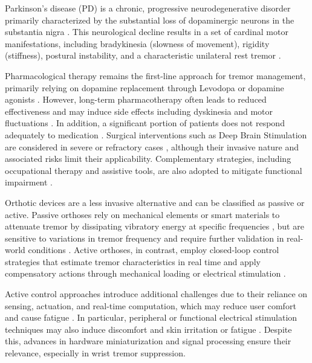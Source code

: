 Parkinson's disease (PD) is a chronic, progressive neurodegenerative disorder primarily characterized by the substantial loss of dopaminergic neurons in the substantia nigra
\citep{Nguyen:2021, Fujikawa:2023, Meng:2022}.
This neurological decline results in a set of cardinal motor manifestations, including bradykinesia (slowness of movement), rigidity (stiffness), postural instability, and a characteristic unilateral rest tremor
\citep{Nguyen:2021, Botzel:2014}. 

Pharmacological therapy remains the first-line approach for tremor management, primarily relying on dopamine replacement through Levodopa or dopamine agonists \citep{Botzel:2014, Lora-Millan:2021}. However, long-term pharmacotherapy often leads to reduced effectiveness and may induce side effects including dyskinesia and motor fluctuations \citep{Lora-Millan:2021, Meng:2022}. In addition, a significant portion of patients does not respond adequately to medication \citep{Fujikawa:2023}. Surgical interventions such as Deep Brain Stimulation are considered in severe or refractory cases \citep{Botzel:2014, Fujikawa:2023}, although their invasive nature and associated risks limit their applicability. Complementary strategies, including occupational therapy and assistive tools, are also adopted to mitigate functional impairment \citep{Mo:2021, Bhidayasiri:2022}.

Orthotic devices are a less invasive alternative and can be classified as passive or active. Passive orthoses rely on mechanical elements or smart materials to attenuate tremor by dissipating vibratory energy at specific frequencies \citep{Gebai:2018, Moura:2025}, but are sensitive to variations in tremor frequency and require further validation in real-world conditions \citep{Heide:2014, Bhidayasiri:2022}. Active orthoses, in contrast, employ closed-loop control strategies that estimate tremor characteristics in real time and apply compensatory actions through mechanical loading or electrical stimulation \citep{Lora-Millan:2021, Meng:2022}.

Active control approaches introduce additional challenges due to their reliance on sensing, actuation, and real-time computation, which may reduce user comfort and cause fatigue \citep{Lora-Millan:2021, Martinez-Nunez:2024}. In particular, peripheral or functional electrical stimulation techniques may also induce discomfort and skin irritation or fatigue \citep{Taheri:2015, Saleh:2022}. Despite this, advances in hardware miniaturization and signal processing ensure their relevance, especially in wrist tremor suppression.

